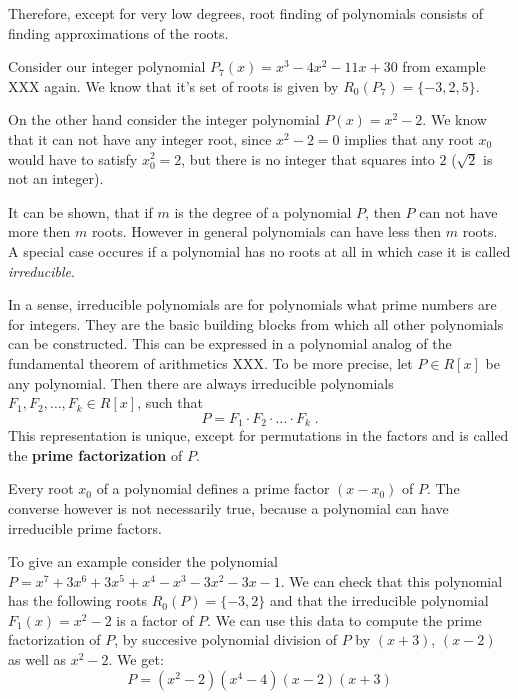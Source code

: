 Therefore, except for very low degrees, root finding of polynomials consists of finding approximations of the roots.
\begin{example}
Consider our integer polynomial $P_7(x)=x^3 - 4 x^2 - 11 x + 30$ from example XXX again. We know that it's set of roots is given by $R_0(P_7)=\{-3,2,5\}$.

On the other hand consider the integer polynomial $P(x)=x^2-2$. We know that it can not have any integer root, since $x^2-2=0$ implies that any root $x_0$ would have to satisfy $x_0^2=2$, but there is no integer that squares into $2$ ($\sqrt{2}$ is not an integer).
\end{example}
It can be shown, that if $m$ is the degree of a polynomial $P$, then $P$ can not have more then $m$ roots. However in general polynomials can have less then $m$ roots. A special case occures if a polynomial has no roots at all in which case it is called \textit{irreducible}. 

In a sense, irreducible polynomials are for polynomials what prime numbers are for integers. They are the basic building blocks from which all other polynomials can be constructed. This can be expressed in a polynomial analog of the fundamental theorem of arithmetics XXX. To be more precise, let $P \in R[x]$ be any polynomial. Then there are always irreducible polynomials $F_1, F_2, \ldots, F_k \in R[x]$, such that
\begin{equation}
P = F_1 \cdot F_2 \cdot \ldots \cdot F_k \;.
\end{equation}
This representation is unique, except for permutations in the factors and is called the \textbf{prime factorization} of $P$.

Every root $x_0$ of a polynomial defines a prime factor $(x-x_0)$ of $P$. The converse however is not necessarily true, because a polynomial can have irreducible prime factors. 
\begin{example} To give an example consider the polynomial 
$P=x^7 + 3 x^6 + 3 x^5 + x^4 - x^3 - 3 x^2 - 3 x - 1$. We can check that this polynomial has the following roots $R_0(P)=\{-3,2\}$ and that the irreducible polynomial $F_1(x)=x^2-2$ is a factor of $P$. We can use this data to compute the prime factorization of $P$, by succesive polynomial division of $P$ by $(x+3)$, $(x-2)$ as well as $x^2-2$. We get:
$$
P= (x^2-2)(x^4-4)(x-2)(x+3)
$$
\end{example}
